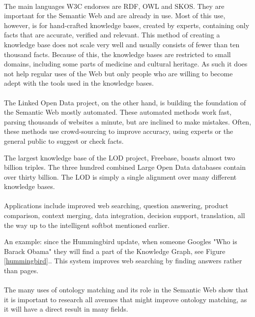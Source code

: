 \documentclass{article}
\begin{document}
 \paragraph{}
 The main languages W3C endorses are RDF, OWL and SKOS\cite{rdf, owl, skos}. They are important for the Semantic Web and are already in use. Most of this use, however, is for hand-crafted knowledge bases, created by experts, containing only facts that are accurate, verified and relevant\cite{mika2015schema}. This method of creating a knowledge base does not scale very well and usually consists of fewer than ten thousand facts. Because of this, the knowledge bases are restricted to small domains, including some parts of medicine and cultural heritage\cite{byrne, le2002}. As such it does not help regular uses of the Web but only people who are willing to become adept with the tools used in the knowledge bases.
 \paragraph{} 
 The Linked Open Data project, on the other hand, is building the foundation of the Semantic Web mostly automated. These automated methods work fast, parsing thousands of websites a minute, but are inclined to make mistakes. Often, these methods use crowd-sourcing to improve accuracy, using experts or the general public to suggest or check facts\cite{zhou2007}.
 
 The largest knowledge base of the LOD project, Freebase, boasts almost two billion triples. The three hundred combined Large Open Data databases contain over thirty billion\cite{dbpedia, lod}. The LOD is simply a single alignment over many different knowledge bases.
 \paragraph{}
 Applications include improved web searching, question answering, product comparison, context merging, data integration, decision support, translation, all the way up to the intelligent softbot mentioned earlier\cite{schreiber, future}.
 
 An example: since the Hummingbird update, when someone Googles "Who is Barack Obama" they will find a part of the Knowledge Graph, see Figure \ref{hummingbird}.. This system improves web searching by finding answers rather than pages. 
 \paragraph{}
 The many uses of ontology matching and its role in the Semantic Web show that it is important to research all avenues that might improve ontology matching, as it will have a direct result in many fields.
 
\end{document}
